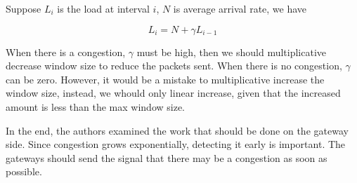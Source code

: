 Suppose $L_i$ is the load at interval $i$, $N$ is average arrival rate, we have

$$L_i = N + \gamma L_{i-1}$$

When there is a congestion, $\gamma$ must be high, then we should multiplicative decrease window size to reduce the packets sent.
When there is no congestion, $\gamma$ can be zero.
However, it would be a mistake to multiplicative increase the window size, instead, we whould only linear increase, given that the increased amount is less than the max window size.

In the end, the authors examined the work that should be done on the gateway side.
Since congestion grows exponentially, detecting it early is important.
The gateways should send the signal that there may be a congestion as soon as possible.
